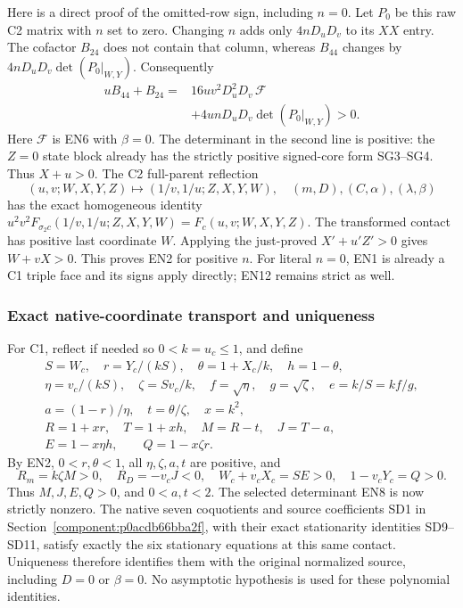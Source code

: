 Here is a direct proof of the omitted-row sign, including \(n=0\).
Let \(P_0\) be this raw C2 matrix with \(n\) set to zero.
Changing \(n\) adds only \(4nD_uD_v\) to its \(XX\) entry.
The cofactor \(B_{24}\) does not contain that column, whereas
\(B_{44}\) changes by \(4nD_uD_v\det(P_0|_{W,Y})\).
Consequently
\[
\begin{split}
 uB_{44}+B_{24}
  ={}&16uv^2D_u^2D_v\,\mathcal F\\
    &+4unD_uD_v\det(P_0|_{W,Y})>0 .
\end{split}\tag{EN12}
\]
Here \(\mathcal F\) is EN6 with \(\beta=0\).  The determinant in
the second line is positive: the \(Z=0\) state block already has
the strictly positive signed-core form SG3--SG4.  Thus \(X+u>0\).
The C2 full-parent reflection
\[
 (u,v;W,X,Y,Z)\mapsto(1/v,1/u;Z,X,Y,W),
 \quad (m,D),(C,\alpha),(\lambda,\beta)
\]
has the exact homogeneous identity
\(u^2v^2F_{\sigma_2c}(1/v,1/u;Z,X,Y,W)=F_c(u,v;W,X,Y,Z)\).
The transformed contact
has positive last coordinate \(W\).  Applying the just-proved
\(X'+u'Z'>0\) gives \(W+vX>0\).
This proves EN2 for positive \(n\).  For literal \(n=0\), EN1 is
already a C1 triple face and its signs apply directly; EN12 remains
strict as well.

\subsubsection*{Exact native-coordinate transport and uniqueness}

For C1, reflect if needed so \(0<k=u_c\le1\), and define
\[
\begin{gathered}
 S=W_c,\quad r=Y_c/(kS),\quad
 \theta=1+X_c/k,\quad h=1-\theta,\\
 \eta=v_c/(kS),\quad \zeta=Sv_c/k,\quad
 f=\sqrt\eta,\quad g=\sqrt\zeta,\quad e=k/S=kf/g,\\
 a=(1-r)/\eta,\quad t=\theta/\zeta,\quad x=k^2,\\
 R=1+xr,\quad T=1+xh,\quad M=R-t,\quad J=T-a,\\
 E=1-x\eta h,\qquad Q=1-x\zeta r .
\end{gathered}\tag{EN13}
\]
By EN2, \(0<r,\theta<1\), all \(\eta,\zeta,a,t\) are positive,
and
\[
 R_m=k\zeta M>0,\quad R_D=-v_cJ<0,\quad
 W_c+v_cX_c=SE>0,\quad 1-v_cY_c=Q>0.
\]
Thus \(M,J,E,Q>0\), and \(0<a,t<2\).
The selected determinant EN8 is now strictly nonzero.  The native
seven coquotients and source coefficients SD1 in Section~\ref{component:p0acdb66bba2f}, with their exact stationarity identities SD9--SD11,
satisfy exactly the six stationary equations at this same contact.
Uniqueness therefore identifies them with the original normalized
source, including \(D=0\) or \(\beta=0\).  No asymptotic hypothesis
is used for these polynomial identities.

